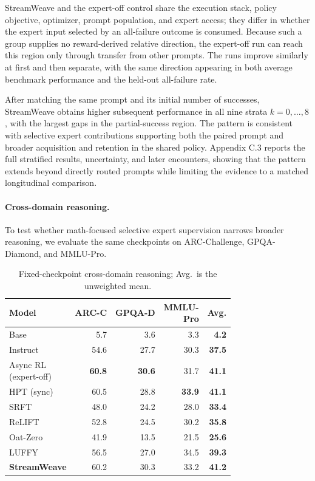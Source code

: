 \documentclass[letterpaper]{article}
\begin{document}
StreamWeave and the expert-off control share the execution stack, policy objective, optimizer, prompt population, and expert access; they differ in whether the expert input selected by an all-failure outcome is consumed.
Because such a group supplies no reward-derived relative direction, the expert-off run can reach this region only through transfer from other prompts.
The runs improve similarly at first and then separate, with the same direction appearing in both average benchmark performance and the held-out all-failure rate.

After matching the same prompt and its initial number of successes, StreamWeave obtains higher subsequent performance in all nine strata $k=0,\ldots,8$, with the largest gaps in the partial-success region.
The pattern is consistent with selective expert contributions supporting both the paired prompt and broader acquisition and retention in the shared policy.
Appendix C.3 reports the full stratified results, uncertainty, and later encounters, showing that the pattern extends beyond directly routed prompts while limiting the evidence to a matched longitudinal comparison.

\paragraph{Cross-domain reasoning.}
To test whether math-focused selective expert supervision narrows broader reasoning, we evaluate the same checkpoints on ARC-Challenge, GPQA-Diamond, and MMLU-Pro.

\begin{table}[!htbp]
\centering
\begin{tabular}{@{}lrrrr@{}}
\toprule
Model & ARC-C & GPQA-D & \shortstack{MMLU-\\Pro} & \textbf{Avg.} \\
\midrule
Base & 5.7 & 3.6 & 3.3 & \textbf{4.2} \\
Instruct & 54.6 & 27.7 & 30.3 & \textbf{37.5} \\
\shortstack[l]{Async RL\\(expert-off)} & \textbf{60.8} & \textbf{30.6} & 31.7 & \textbf{41.1} \\
HPT (sync) & 60.5 & 28.8 & \textbf{33.9} & \textbf{41.1} \\
SRFT & 48.0 & 24.2 & 28.0 & \textbf{33.4} \\
ReLIFT & 52.8 & 24.5 & 30.2 & \textbf{35.8} \\
Oat-Zero & 41.9 & 13.5 & 21.5 & \textbf{25.6} \\
LUFFY & 56.5 & 27.0 & 34.5 & \textbf{39.3} \\
\textbf{StreamWeave} & 60.2 & 30.3 & 33.2 & \textbf{41.2} \\
\bottomrule
\end{tabular}
\caption{Fixed-checkpoint cross-domain reasoning; Avg.\ is the unweighted mean.}
\label{tab:cross-domain}
\end{table}
\end{document}
